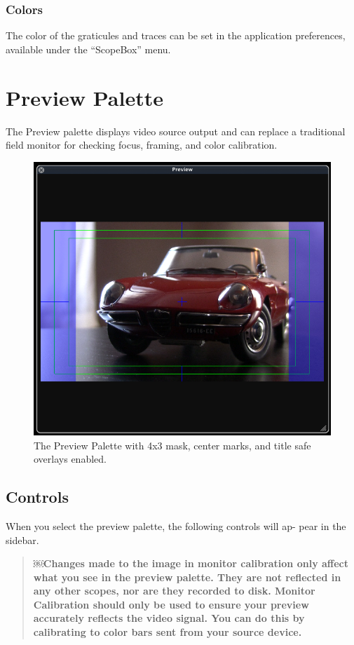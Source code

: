 \documentclass[10,letterpaper,]{report}
\begin{document}
\subsection{Colors}

The color of the graticules and traces can be set in the application
preferences, available under the ``ScopeBox'' menu.

\chapter{Preview Palette}

The Preview palette displays video source output and can replace a
traditional field monitor for checking focus, framing, and color
calibration.

\begin{figure}[htbp]
\centering
\includegraphics{images/PreviewWithOverlays.png}
\caption{The Preview Palette with 4x3 mask, center marks, and title safe
overlays enabled.}
\end{figure}

\section{Controls}

When you select the preview palette, the following controls will ap-
pear in the sidebar.

\begin{quote}
\textbf{￼Changes made to the image in monitor calibration only affect
what you see in the preview palette. They are not reflected in any other
scopes, nor are they recorded to disk. Monitor Calibration should only
be used to ensure your preview accurately reflects the video signal. You
can do this by calibrating to color bars sent from your source device.}
\end{quote}
\end{document}

